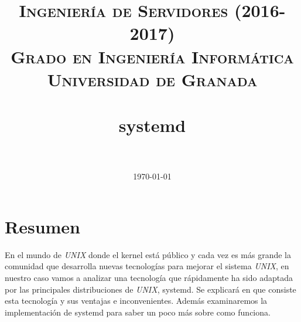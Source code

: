 


\title{	
\normalfont \normalsize 
\textsc{\textbf{Ingeniería de Servidores (2016-2017)} \\ Grado en Ingeniería Informática \\ Universidad de Granada} \\ [25pt] %
\horrule{0.5pt} \\[0.4cm] %
\huge systemd \\ %
\horrule{2pt} \\[0.5cm] %
}

\date{\normalsize\today} %




\maketitle %

\newpage


\section{Resumen}%
En el mundo de \textit{UNIX} donde el kernel está público y 
cada vez es más grande la comunidad que desarrolla nuevas tecnologías 
para mejorar el sistema \textit{UNIX}, en nuestro caso vamos a analizar
una tecnología que rápidamente ha sido adaptada por las principales 
distribuciones de \textit{UNIX}, systemd. Se explicará en que consiste esta 
tecnología y sus ventajas e inconvenientes. Además examinaremos la
 implementación de systemd para saber un poco más sobre como funciona.


